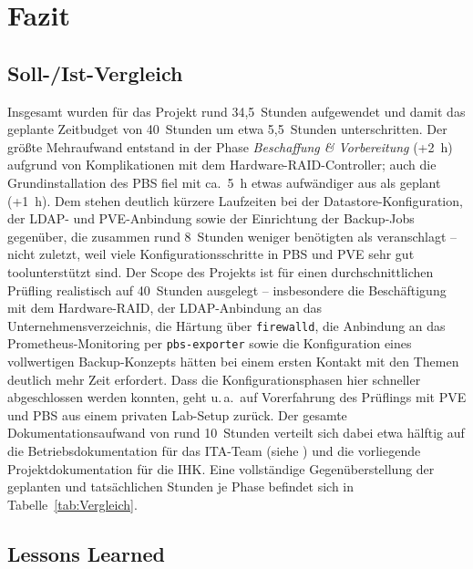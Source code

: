 \section{Fazit}
\label{sec:Fazit}

\subsection{Soll-/Ist-Vergleich}
\label{sec:SollIstVergleich}

Insgesamt wurden für das Projekt rund 34{,}5~Stunden aufgewendet
und damit das geplante Zeitbudget von 40~Stunden um etwa
5{,}5~Stunden unterschritten. Der größte Mehraufwand entstand in
der Phase \emph{Beschaffung \& Vorbereitung} (+2~h) aufgrund von
Komplikationen mit dem Hardware-\ac{RAID}-Controller; auch die
Grundinstallation des \ac{PBS} fiel mit ca.~5~h etwas aufwändiger
aus als geplant (+1~h). Dem stehen deutlich kürzere Laufzeiten
bei der Datastore-Konfiguration, der LDAP- und PVE-Anbindung sowie
der Einrichtung der Backup-Jobs gegenüber, die zusammen rund
8~Stunden weniger benötigten als veranschlagt -- nicht zuletzt,
weil viele Konfigurationsschritte in \ac{PBS} und \ac{PVE} sehr gut
toolunterstützt sind. Der Scope des Projekts ist für einen durchschnittlichen Prüfling
realistisch auf 40~Stunden ausgelegt -- insbesondere die
Beschäftigung mit dem Hardware-\ac{RAID}, der LDAP-Anbindung an
das Unternehmensverzeichnis, die Härtung über \texttt{firewalld},
die Anbindung an das Prometheus-Monitoring per
\texttt{pbs-exporter} sowie die Konfiguration eines vollwertigen
Backup-Konzepts hätten bei einem ersten Kontakt mit den Themen
deutlich mehr Zeit erfordert. Dass die Konfigurationsphasen hier
schneller abgeschlossen werden konnten, geht u.\,a.\ auf
Vorerfahrung des Prüflings mit \ac{PVE} und \ac{PBS} aus einem
privaten Lab-Setup zurück. Der gesamte Dokumentationsaufwand von rund 10~Stunden verteilt sich
dabei etwa hälftig auf die Betriebsdokumentation für das
\ac{ITA}-Team (siehe ) und die
vorliegende Projektdokumentation für die \ac{IHK}.
Eine vollständige Gegenüberstellung der
geplanten und tatsächlichen Stunden je Phase befindet sich in
Tabelle~\ref{tab:Vergleich}.


\subsection{Lessons Learned}
\label{sec:LessonsLearned}

